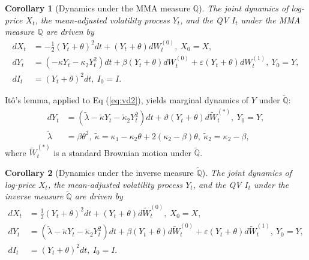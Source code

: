 \documentclass[11pt,a4paper] {article}
\newtheorem{corollary}{Corollary}[section]
\begin{document}
\begin{corollary}[Dynamics under the MMA measure $\mathbb{Q}$]\label{coroll:mma_dynam} The joint dynamics of log-price $X_t$, the mean-adjusted volatility process $Y_t$, and the QV $I_t$ under the MMA measure $\mathbb{Q}$ are driven by
\begin{equation} \label{eq:svmd2}
\begin{split}
dX_{t}&= -\frac{1}{2}\left(Y_{t}+\theta\right)^{2}dt+\left(Y_{t}+\theta\right)dW^{(0)}_{t}, \ X_{0} =X, \\
dY_{t}& = \left(-\kappa Y_{t}-\kappa_{2}Y^{2}_{t}\right)dt +  \beta  \left(Y_{t}+\theta\right)dW^{(0)}_{t} +  \varepsilon \left(Y_{t}+\theta\right)dW^{(1)}_{t}, \ Y_{0}=Y, \\
dI_{t}&=\left(Y_{t}+\theta\right)^{2}dt, \ I_{0}=I.
\end{split}
\end{equation}
\end{corollary}


It\^{o}'s lemma, applied to Eq (\ref{eq:vd2}), yields marginal dynamics of $Y$ under $\tilde{\mathbb{Q}}$:
\begin{equation} \label{eq:vd3}
\begin{split}
dY_{t} &=  \left(\tilde\lambda- \tilde\kappa Y_{t}   - \tilde\kappa_{2}Y^{2}_{t}\right)dt+ \vartheta \left(Y_{t}+\theta\right) d\widetilde W^{(*)}_{t}, \ Y_{0}=Y, \\
\tilde\lambda &= \beta\theta^{2}, \ \tilde\kappa = \kappa_{1} - \kappa_{2}\theta +2(\kappa_{2}-\beta)\theta, \ \tilde\kappa_2 = \kappa_{2} - \beta,
\end{split}
\end{equation}
where $\widetilde W^{(*)}_{t}$ is a standard Brownian motion under $\tilde{\mathbb{Q}}$.


\begin{corollary}[Dynamics under the inverse measure $\tilde{\mathbb{Q}}$] The joint dynamics of log-price $X_t$, the mean-adjusted volatility process $Y_t$, and the QV $I_t$ under the inverse measure $\tilde{\mathbb{Q}}$ are driven by
\begin{equation} \label{eq:inverse}
\begin{split}
dX_{t}&= \frac{1}{2}\left(Y_{t}+\theta\right)^{2}dt+\left(Y_{t}+\theta\right)d\widetilde W^{(0)}_{t}, \ X_{0} =X, \\
dY_{t}& = \left(\tilde\lambda-\tilde\kappa Y_{t}-\tilde\kappa_{2}Y^{2}_{t}\right)dt +  \beta  \left(Y_{t}+\theta\right)d\widetilde W^{(0)}_{t} +  \varepsilon \left(Y_{t}+\theta\right)d\widetilde W^{(1)}_{t}, \ Y_{0}=Y, \\
dI_{t}&=\left(Y_{t}+\theta\right)^{2}dt, \ I_{0}=I.
\end{split}
\end{equation}
\end{corollary}
\end{document}
